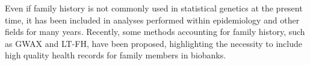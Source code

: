 Even if family history is not commonly used in statistical genetics at the present time, it has been included in analyses performed within epidemiology and other fields for many years\cite{schendel2022evaluating,johns2001systematic,guttmacher2004family,runeson2003family}. Recently, some methods accounting for family history, such as GWAX and LT-FH, have been proposed, highlighting the necessity to include high quality health records for family members in biobanks. 

